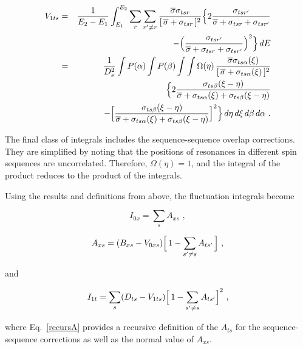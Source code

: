 \begin{eqnarray}
  V_{1ts} &=& \frac{1}{E_2-E_1}\int_{E_1}^{E_2}\sum_r\sum_{r'\neq r}
    \frac{\overline{\sigma}\sigma_{tsr}}{[\,\overline{\sigma}
      +\sigma_{tsr}\,]^2}\Bigl\{2\frac{\sigma_{tsr'}}
       {\overline{\sigma}+\sigma_{tsr}+\sigma_{tsr'}} \nonumber\\
    & &\;\;\;-\Bigl(\frac{\sigma_{tsr'}}{\overline{\sigma}
        +\sigma_{tsr}+\sigma_{tsr'}}\Bigr)^2\Bigr\}\,dE \nonumber\\
  &=& \frac{1}{D_s^2}\int P(\alpha)\int P(\beta)\int\int
     \Omega(\eta)\,\frac{\overline{\sigma}\sigma_{ts\alpha}(\xi)}
      {[\,\overline{\sigma}+\sigma_{ts\alpha}(\xi)\,]^2} \nonumber\\
    & &\;\;\;\Bigl\{2\frac{\sigma_{ts\beta}(\xi-\eta)}
        {\overline{\sigma}+\sigma_{ts\alpha}(\xi)
          +\sigma_{ts\beta}(\xi-\eta)} \nonumber\\
  & &\;\;\;-\Bigl[\frac{\sigma_{ts\beta}(\xi-\eta)}
      {\overline{\sigma}+\sigma_{ts\alpha}(\xi)+\sigma_{ts\beta}(\xi-\eta)}
        \Bigr]^2 \Bigr\}\,d\eta\,d\xi\,d\beta\,d\alpha \,\,.
\end{eqnarray}

The final class of integrals includes the sequence-sequence overlap
corrections.  They are simplified by noting that the positions of
resonances in different spin sequences are uncorrelated.  Therefore,
$\Omega(\eta){=}1$, and the integral of the product reduces to the
product of the integrals.

Using the results and definitions from above, the fluctuation integrals become

\begin{equation}
  I_{0x} = \sum_s A_{xs}\,\,,
\label{Izero}
\end{equation}

\begin{equation}
  A_{xs} = (B_{xs}-V_{0xs})\Bigl[\,1-\sum_{s'\neq s}
     A_{ts'}\,\Bigr]\,\,,
\label{recursA}
\end{equation}

\noindent
and

\begin{equation}
  I_{1t} = \sum_s(D_{ts}-V_{1ts})\Bigl[\,1-\sum_{s'\neq s}
    A_{ts'}\Bigr]^2\,\,,
\label{Ione}
\end{equation}

\noindent
where Eq.~\ref{recursA} provides a recursive definition of the $A_{ts}$ for
the sequence-sequence corrections as well as the normal value of
$A_{xs}$.

